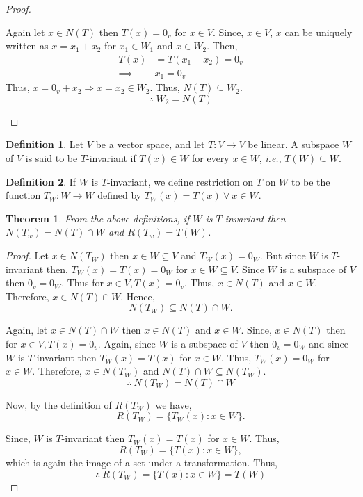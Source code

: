 \documentclass[12pt, a4paper]{article}
\newtheorem{theorem}{Theorem}[section]
\theoremstyle{definition}
\newtheorem{definition}{Definition}[section]
\theoremstyle{remark}
\begin{document}
\begin{proof}
\begin{enumerate}
        Again let $x \in N(T)$ then $T(x) = 0_v$ for $x \in V$. Since, $x \in V$, $x$ can be uniquely written as $x = x_1 + x_2$ for $x_1 \in W_1$ and $x \in W_2$. Then,
        \begin{align*}
            T(x) &= T(x_1 + x_2) = 0_v\\
            \implies & x_1 = 0_v
        \end{align*}
        Thus, $x = 0_v + x_2 \Rightarrow x = x_2 \in W_2$. Thus, $N(T) \subseteq W_2$.
        \[\therefore \ W_2 = N(T)\]
    \end{enumerate}
\end{proof}

\begin{definition}
    Let $V$ be a vector space, and let $T:V \to V$ be linear. A subspace $W$ of $V$ is said to be $T$-invariant if $T(x) \in W$ for every $x \in W$, \textit{i.e.}, $T(W) \subseteq W$.
\end{definition}

\begin{definition}
    If $W$ is $T$-invariant, we define restriction on $T$ on $W$ to be the function $T_W:W \to W$ defined by $T_W(x)=T(x) \ \forall \ x \in W$.
\end{definition}

\begin{theorem}
    From the above definitions, if $W$ is $T$-invariant then $N(T_w) = N(T) \cap W$ and $R(T_w) = T(W)$.
\end{theorem}

\begin{proof}
    Let $x \in N(T_W)$ then $x \in W \subseteq V$ and $T_W(x) = 0_W$. But since $W$ is $T$-invariant then, $T_W(x) = T(x) = 0_W$ for $x \in W \subseteq V$. Since $W$ is a subspace of $V$ then $0_v = 0_W$. Thus for $x \in V, T(x) = 0_v$. Thus, $x \in N(T)$ and $x \in W$. Therefore, $x \in N(T) \cap W$. Hence,
    $$N(T_W) \subseteq N(T) \cap W.$$

    Again, let $x \in N(T) \cap W$ then $x \in N(T)$ and $x \in W$. Since, $x \in N(T)$ then for $x \in V, T(x) = 0_v$. Again, since $W$ is a subspace of $V$ then $0_v = 0_W$ and since $W$ is $T$-invariant then $T_W(x) = T(x)$ for $x \in W$. Thus, $T_W(x) = 0_W$ for $x \in W$. Therefore, $x \in N(T_W)$ and $N(T) \cap W \subseteq N(T_W)$.
    \[
    \therefore \ N(T_W) = N(T) \cap W
    \]

    Now, by the definition of $R(T_W)$ we have,
    $$R(T_W) = \{T_W(x) : x \in W\}.$$

    Since, $W$ is $T$-invariant then $T_W(x) = T(x)$ for $x \in W$. Thus,
    $$R(T_W) = \{T(x) : x \in W\},$$
    which is again the image of a set under a transformation. Thus,
    $$\therefore \ R(T_W) = \{T(x) : x \in W\} = T(W)$$
\end{proof}
\end{document}
